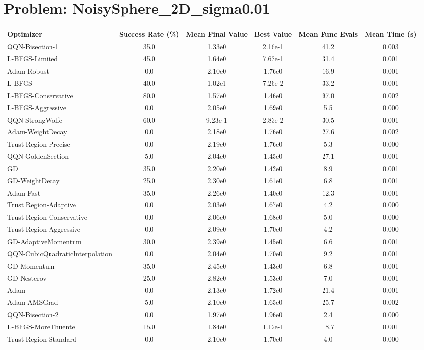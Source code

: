\documentclass{article}
\begin{document}
\section{Problem: NoisySphere\_2D\_sigma0.01}
\begin{longtable}{p{3cm}*{5}{c}}
\toprule
\textbf{Optimizer} & \textbf{Success Rate (\%)} & \textbf{Mean Final Value} & \textbf{Best Value} & \textbf{Mean Func Evals} & \textbf{Mean Time (s)} \\
\midrule
QQN-Bisection-1 & 35.0 & 1.33e0 & 2.16e-1 & 41.2 & 0.003 \\
L-BFGS-Limited & 45.0 & 1.64e0 & 7.63e-1 & 31.4 & 0.001 \\
Adam-Robust & 0.0 & 2.10e0 & 1.76e0 & 16.9 & 0.001 \\
L-BFGS & 40.0 & 1.02e1 & 7.26e-2 & 33.2 & 0.001 \\
L-BFGS-Conservative & 80.0 & 1.57e0 & 1.46e0 & 97.0 & 0.002 \\
L-BFGS-Aggressive & 0.0 & 2.05e0 & 1.69e0 & 5.5 & 0.000 \\
QQN-StrongWolfe & 60.0 & 9.23e-1 & 2.83e-2 & 30.5 & 0.001 \\
Adam-WeightDecay & 0.0 & 2.18e0 & 1.76e0 & 27.6 & 0.002 \\
Trust Region-Precise & 0.0 & 2.19e0 & 1.76e0 & 5.3 & 0.000 \\
QQN-GoldenSection & 5.0 & 2.04e0 & 1.45e0 & 27.1 & 0.001 \\
GD & 35.0 & 2.20e0 & 1.42e0 & 8.9 & 0.001 \\
GD-WeightDecay & 25.0 & 2.30e0 & 1.61e0 & 6.8 & 0.001 \\
Adam-Fast & 35.0 & 2.26e0 & 1.40e0 & 12.3 & 0.001 \\
Trust Region-Adaptive & 0.0 & 2.03e0 & 1.67e0 & 4.2 & 0.000 \\
Trust Region-Conservative & 0.0 & 2.06e0 & 1.68e0 & 5.0 & 0.000 \\
Trust Region-Aggressive & 0.0 & 2.09e0 & 1.70e0 & 4.2 & 0.000 \\
GD-AdaptiveMomentum & 30.0 & 2.39e0 & 1.45e0 & 6.6 & 0.001 \\
QQN-CubicQuadraticInterpolation & 0.0 & 2.04e0 & 1.70e0 & 9.2 & 0.001 \\
GD-Momentum & 35.0 & 2.45e0 & 1.43e0 & 6.8 & 0.001 \\
GD-Nesterov & 25.0 & 2.82e0 & 1.53e0 & 7.0 & 0.001 \\
Adam & 0.0 & 2.13e0 & 1.72e0 & 21.4 & 0.001 \\
Adam-AMSGrad & 5.0 & 2.10e0 & 1.65e0 & 25.7 & 0.002 \\
QQN-Bisection-2 & 0.0 & 1.97e0 & 1.96e0 & 2.4 & 0.000 \\
L-BFGS-MoreThuente & 15.0 & 1.84e0 & 1.12e-1 & 18.7 & 0.001 \\
Trust Region-Standard & 0.0 & 2.10e0 & 1.70e0 & 4.0 & 0.000 \\
\bottomrule
\end{longtable}
\end{document}
